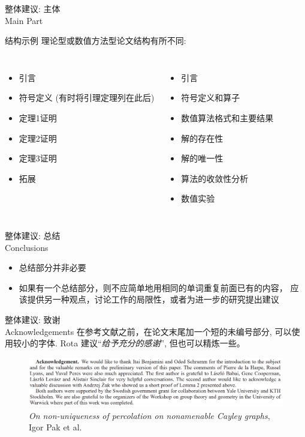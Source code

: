 \documentclass[UTF8]{ctexbeamer}
\begin{document}
\begin{frame}{整体建议: 主体 \\ Main Part}
\begin{alertblock}{结构示例}
理论型或数值方法型论文结构有所不同: 
\end{alertblock}
\begin{columns}
\begin{itemize}
    \item 引言 
    \item 符号定义 (有时将引理定理列在此后)
    \item 定理1证明 
    \item 定理2证明
    \item 定理3证明
    \item 拓展
\end{itemize}
\begin{itemize}
    \item 引言
    \item 符号定义和算子
    \item 数值算法格式和主要结果
    \item 解的存在性
    \item 解的唯一性
    \item 算法的收敛性分析
    \item 数值实验
\end{itemize}
\end{columns}
\end{frame}

\begin{frame}{整体建议: 总结 \\ Conclusions}

\begin{itemize}
    \item 总结部分并非必要
    \item 如果有一个总结部分，则不应简单地用相同的单词重复前面已有的内容， 应该提供另一种观点，讨论工作的局限性，或者为进一步的研究提出建议
\end{itemize}
\end{frame}

\begin{frame}{整体建议: 致谢 \\ Acknowledgements}
在参考文献之前，在论文末尾加一个短的未编号部分, 可以使用较小的字体. Rota 建议“\textit{给予充分的感谢}”, 但也可以精炼一些。

\begin{figure}
    \centering
    \includegraphics[width=\textwidth]{figure/ackPic.png}
    \caption{\textit{On non-uniqueness of percolation on nonamenable Cayley graphs}, Igor Pak et al.}
    \label{fig:my_label}
\end{figure}
\end{frame}
\end{document}
